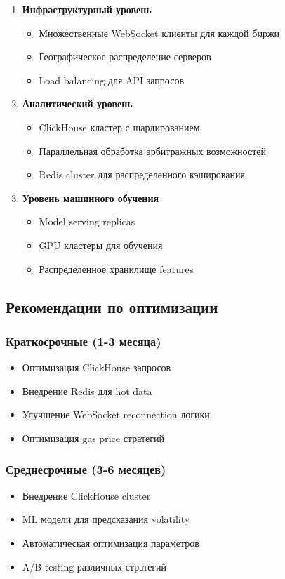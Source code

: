 \documentclass[a4paper,11pt]{article}
\begin{document}
\begin{enumerate}
    \item \textbf{Инфраструктурный уровень}
    \begin{itemize}
        \item Множественные WebSocket клиенты для каждой биржи
        \item Географическое распределение серверов
        \item Load balancing для API запросов
    \end{itemize}
    
    \item \textbf{Аналитический уровень}
    \begin{itemize}
        \item ClickHouse кластер с шардированием
        \item Параллельная обработка арбитражных возможностей
        \item Redis cluster для распределенного кэширования
    \end{itemize}
    
    \item \textbf{Уровень машинного обучения}
    \begin{itemize}
        \item Model serving replicas
        \item GPU кластеры для обучения
        \item Распределенное хранилище features
    \end{itemize}
\end{enumerate}

\subsection{Рекомендации по оптимизации}

\subsubsection{Краткосрочные (1-3 месяца)}
\begin{itemize}
    \item Оптимизация ClickHouse запросов
    \item Внедрение Redis для hot data
    \item Улучшение WebSocket reconnection логики
    \item Оптимизация gas price стратегий
\end{itemize}

\subsubsection{Среднесрочные (3-6 месяцев)}
\begin{itemize}
    \item Внедрение ClickHouse cluster
    \item ML модели для предсказания volatility
    \item Автоматическая оптимизация параметров
    \item A/B testing различных стратегий
\end{itemize}
\end{document}
